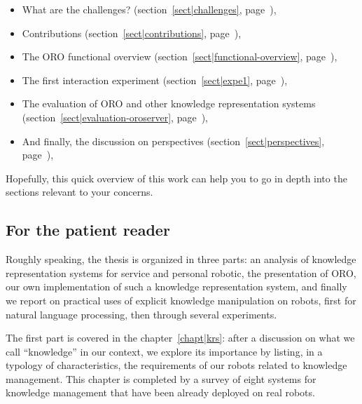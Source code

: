 \begin{itemize} \item What are the challenges? (section~\ref{sect|challenges},
            page~\pageref{sect|challenges}),

    \item Contributions (section~\ref{sect|contributions},
        page~\pageref{sect|contributions}),

    \item The ORO functional overview (section~\ref{sect|functional-overview},
        page~\pageref{sect|functional-overview}),

    \item The first interaction experiment (section~\ref{sect|expe1},
        page~\pageref{sect|expe1}),

    \item The evaluation of ORO and other knowledge representation systems
        (section~\ref{sect|evaluation-oroserver},
        page~\pageref{sect|evaluation-oroserver}),

    \item And finally, the discussion on perspectives
        (section~\ref{sect|perspectives}, page~\pageref{sect|perspectives}),

\end{itemize}

Hopefully, this quick overview of this work can help you to go in depth into
the sections relevant to your concerns.


\subsection*{For the patient reader}

Roughly speaking, the thesis is organized in three parts: an analysis of
knowledge representation systems for service and personal robotic, the
presentation of ORO, our own implementation of such a knowledge representation
system, and finally we report on practical uses of explicit knowledge
manipulation on robots, first for natural language processing, then through
several experiments.

The first part is covered in the chapter~\ref{chapt|krs}: after a discussion on
what we call ``knowledge'' in our context, we explore its importance by
listing, in a typology of characteristics, the requirements of our robots
related to knowledge management. This chapter is completed by a survey of
eight systems for knowledge management that have been already deployed on real
robots.


